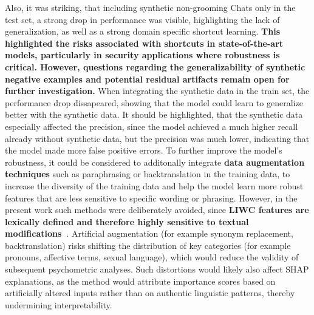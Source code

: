 Also, it was striking, that including synthetic non-grooming Chats only in the test set, a strong drop in performance was visible, highlighting the lack of generalization, as well as a strong domain specific shortcut learning.  \textbf{This highlighted the risks associated with shortcuts in state-of-the-art models, particularly in security applications where robustness is critical. However, questions regarding the generalizability of synthetic negative examples and potential residual artifacts remain open for further investigation.} When integrating the synthetic data in the train set, the performance drop dissapeared, showing that the model could learn to generalize better with the synthetic data. It should be highlighted, that the synthetic data especially affected the precision, since the model achieved a much higher recall already without synthetic data, but the precision was much lower, indicating that the model made more false positive errors. To further improve the model's robustness, it could be considered to additonally integrate \textbf{data augmentation techniques} such as paraphrasing or backtranslation in the training data, to increase the diversity of the training data and help the model learn more robust features that are less sensitive to specific wording or phrasing. However, in the present work such methods were deliberately avoided, since \textbf{LIWC features are lexically defined and therefore highly sensitive to textual modifications~\cite{tausczik2010psychological}}. Artificial augmentation (for example synonym replacement, backtranslation) risks shifting the distribution of key categories (for example pronouns, affective terms, sexual language), which would reduce the validity of subsequent psychometric analyses. Such distortions would likely also affect SHAP explanations, as the method would attribute importance scores based on artificially altered inputs rather than on authentic linguistic patterns, thereby undermining interpretability. 

